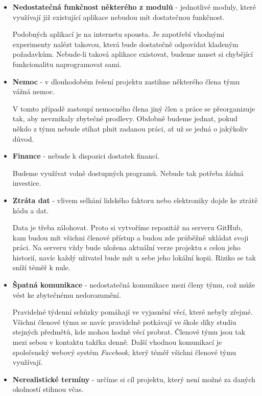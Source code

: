 \documentclass[12pt,a4paper]{article}
\begin{document}
\begin{itemize}
	\item{\textbf{Nedostatečná funkčnost některého z modulů}} - jednotlivé moduly, které využívají již existující aplikace nebudou mít dostatečnou funkčnost.
	
	Podobných aplikací je na internetu spousta. Je zapotřebí vhodnými experimenty nalézt takovou, která bude dostatečně odpovídat kladeným požadavkům. Nebude-li taková aplikace existovat, budeme muset si chybějící funkcionalitu naprogramovat sami.
	
	\item{\textbf{Nemoc}} - v dlouhodobém řešení projektu zastihne některého člena týmu vážná nemoc. 
	
	V tomto případě zastoupí nemocného člena jiný člen a práce se přeorganizuje tak, aby nevznikaly zbytečné prodlevy. Obdobně budeme jednat, pokud někdo z týmu nebude stíhat plnit zadanou práci, ať už se jedná o jakýkoliv důvod. 
	
	\item{\textbf{Finance}} - nebude k dispozici dostatek financí.
	
	Budeme využívat volně dostupných programů. Nebude tak potřeba žádná investice.
	
	\item{\textbf{Ztráta dat}} - vlivem selhání lidského faktoru nebo elektroniky dojde ke ztrátě kódu a dat.
	
	Data je třeba zálohovat. Proto si vytvoříme repozitář na serveru GitHub, kam budou mít všichni členové přístup a budou zde průběžně ukládat svoji práci. Na serveru vždy bude uložena aktuální verze projektu s celou jeho historií, navíc každý uživatel bude mít u sebe jeho lokální kopii. Riziko se tak sníží téměř k nule. 
	
	\item{\textbf{Špatná komunikace}} - nedostatečná komunikace mezi členy týmu, což může vést ke zbytečnému nedorozumění. 
	
	Pravidelné týdenní schůzky pomáhají ve vyjasnění věcí, které nebyly zřejmé. Všichni členové týmu se navíc pravidelně potkávají ve škole díky studiu stejných předmětů, kde mohou hodně věcí probrat. Členové týmu jsou tak mezi sebou v kontaktu takřka denně. Další vhodnou komunikací je společenský webový systém \textit{Facebook}, který téměř všichni členové týmu využívají.
	
	\item{\textbf{Nerealistické termíny}} - určíme si cíl projektu, který není možné za daných okolností stihnou včas.
	

\end{itemize}
\end{document}
